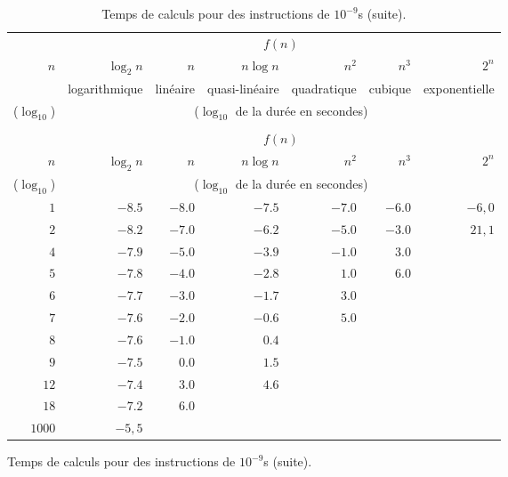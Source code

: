 \begin{figure}[!h]
\begin{center}
\begin{longtable}{rrrrrrr}
\caption{Temps de calculs pour des instructions de $10^{-9}$s.}\label{table.complexites.usuelles}\\
\toprule
   & \multicolumn{6}{c}{$f(n)$} \\ \cmidrule(l){2-7}
   $n$   & $\log_{2} n$ & $n$      & $n\log n$& $n^2$    & $n^3$     &
   $2^n$\\
  
& logarithmique & linéaire &quasi-linéaire & quadratique & cubique & exponentielle \\  \cmidrule(l){2-7}
   
   ($\log_{10}$) & \multicolumn{6}{c}{($\log_{10}$ de la
     durée en secondes)}\\
   \midrule
\endfirsthead
\caption{Temps de calculs pour des instructions de $10^{-9}$s (suite).}\\
\toprule
   & \multicolumn{6}{c}{$f(n)$} \\ \cmidrule(l){2-7}
   $n$   & $\log_{2} n$ & $n$      & $n\log n$& $n^2$    & $n^3$     &
   $2^n$\\
   ($\log_{10}$) & \multicolumn{6}{c}{($\log_{10}$ de la
     durée en secondes)}\\
   \midrule
\endhead
$1$ & $-8.5$ & $-8.0$ & $-7.5$ & $-7.0$ & $-6.0$ & $-6,0$\\
$2$ & $-8.2$ & $-7.0$ & $-6.2$ & $-5.0$ & $-3.0$ & $21,1$\\
$4$ & $-7.9$ & $-5.0$ & $-3.9$ & $-1.0$ & $3.0$ & \\
$5$ & $-7.8$ & $-4.0$ & $-2.8$ & $1.0$ & $6.0$ & \\
$6$ & $-7.7$ & $-3.0$ & $-1.7$ & $3.0$ & & \\
$7$ & $-7.6$ & $-2.0$ & $-0.6$ & $5.0$ & & \\
$8$ & $-7.6$ & $-1.0$ & $0.4$ & & & \\
$9$ & $-7.5$ & $0.0$ & $1.5$ & & & \\
$12$ & $-7.4$ & $3.0$ & $4.6$ & & & \\
$18$ & $-7.2$ & $6.0$ & & & & \\
$1000$ & $-5,5$ & & & & & \\
 \bottomrule  
\end{longtable}
\end{center}
\end{figure}

